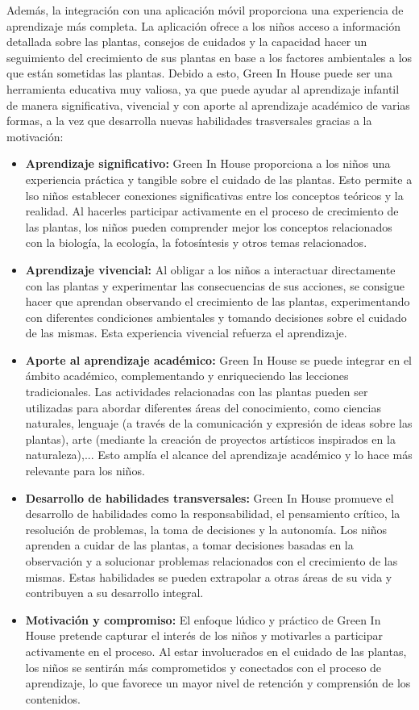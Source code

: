 Además, la integración con una aplicación móvil proporciona una experiencia de aprendizaje más completa. La aplicación ofrece a los niños acceso a información detallada sobre las plantas, consejos de cuidados y la capacidad hacer un seguimiento del crecimiento de sus plantas en base a los factores ambientales a los que están sometidas las plantas. Debido a esto, Green In House puede ser una herramienta educativa muy valiosa, ya que puede ayudar al aprendizaje infantil de manera significativa, vivencial y con aporte al aprendizaje académico de varias formas, a la vez que desarrolla nuevas habilidades trasversales gracias a la motivación:
\begin{itemize}
    \item \textbf{Aprendizaje significativo:} Green In House proporciona a los niños una experiencia práctica y tangible sobre el cuidado de las plantas. Esto permite a lso niños establecer conexiones significativas entre los conceptos teóricos y la realidad. Al hacerles participar activamente en el proceso de crecimiento de las plantas, los niños pueden comprender mejor los conceptos relacionados con la biología, la ecología, la fotosíntesis y otros temas relacionados.
    \item \textbf{Aprendizaje vivencial:} Al obligar a los niños a interactuar directamente con las plantas y experimentar las consecuencias de sus acciones, se consigue hacer que aprendan observando el crecimiento de las plantas, experimentando con diferentes condiciones ambientales y tomando decisiones sobre el cuidado de las mismas. Esta experiencia vivencial refuerza el aprendizaje.
    \item \textbf{Aporte al aprendizaje académico:} Green In House se puede integrar en el ámbito académico, complementando y enriqueciendo las lecciones tradicionales. Las actividades relacionadas con las plantas pueden ser utilizadas para abordar diferentes áreas del conocimiento, como ciencias naturales, lenguaje (a través de la comunicación y expresión de ideas sobre las plantas), arte (mediante la creación de proyectos artísticos inspirados en la naturaleza),... Esto amplía el alcance del aprendizaje académico y lo hace más relevante para los niños.
    \item \textbf{Desarrollo de habilidades transversales:} Green In House promueve el desarrollo de habilidades como la responsabilidad, el pensamiento crítico, la resolución de problemas, la toma de decisiones y la autonomía. Los niños aprenden a cuidar de las plantas, a tomar decisiones basadas en la observación y a solucionar problemas relacionados con el crecimiento de las mismas. Estas habilidades se pueden extrapolar a otras áreas de su vida y contribuyen a su desarrollo integral.
    \item \textbf{Motivación y compromiso:} El enfoque lúdico y práctico de Green In House pretende capturar el interés de los niños y motivarles a participar activamente en el proceso. Al estar involucrados en el cuidado de las plantas, los niños se sentirán más comprometidos y conectados con el proceso de aprendizaje, lo que favorece un mayor nivel de retención y comprensión de los contenidos.
\end{itemize}
